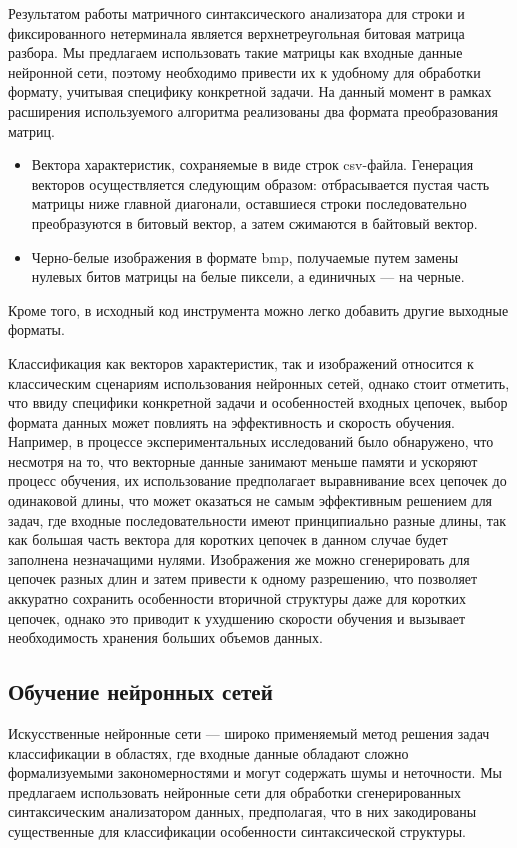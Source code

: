 \documentclass[14pt]{matmex-diploma-custom}
\begin{document}
Результатом работы матричного синтаксического анализатора для строки и фиксированного нетерминала является верхнетреугольная битовая матрица разбора. Мы предлагаем использовать такие матрицы как входные данные нейронной сети, поэтому необходимо привести их к удобному для обработки формату, учитывая специфику конкретной задачи. На данный момент в рамках расширения используемого алгоритма реализованы два формата преобразования матриц.
\begin{itemize}
    \item Вектора характеристик, сохраняемые в виде строк csv-файла. Генерация векторов осуществляется следующим образом: отбрасывается пустая часть матрицы ниже главной диагонали, оставшиеся строки последовательно преобразуются в битовый вектор, а затем сжимаются в байтовый вектор.
    \item Черно-белые изображения в формате bmp, получаемые путем замены нулевых битов матрицы на белые пиксели, а единичных --- на черные.
\end{itemize}
Кроме того, в исходный код инструмента можно легко добавить другие выходные форматы.

Классификация как векторов характеристик, так и изображений относится к классическим сценариям использования нейронных сетей, однако стоит отметить, что ввиду специфики конкретной задачи и особенностей входных цепочек, выбор формата данных может повлиять на эффективность и скорость обучения. Например, в процессе экспериментальных исследований было обнаружено, что несмотря на то, что векторные данные занимают меньше памяти и ускоряют процесс обучения, их использование предполагает выравнивание всех цепочек до одинаковой длины, что может оказаться не самым эффективным решением для задач, где входные последовательности имеют принципиально разные длины, так как большая часть вектора для коротких цепочек в данном случае будет заполнена незначащими нулями. Изображения же можно сгенерировать для цепочек разных длин и затем привести к одному разрешению, что позволяет аккуратно сохранить особенности вторичной структуры даже для коротких цепочек, однако это приводит к ухудшению скорости обучения и вызывает необходимость хранения больших объемов данных. 

\subsection{Обучение нейронных сетей}
Искусственные нейронные сети --- широко применяемый метод решения задач классификации в областях, где входные данные обладают сложно формализуемыми закономерностями и могут содержать шумы и неточности. Мы предлагаем использовать нейронные сети для обработки сгенерированных синтаксическим анализатором данных, предполагая, что в них закодированы существенные для классификации особенности синтаксической структуры.
\end{document}
